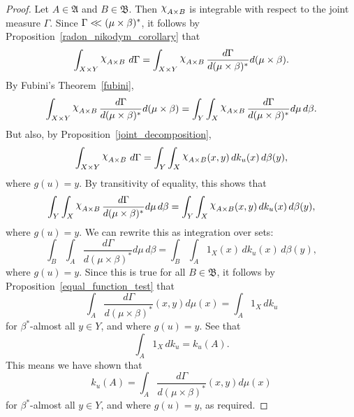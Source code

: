 \documentclass[
twoside=true,
paper=letter,
fontsize=9pt,
pagesize=auto,
leqno,
openany,
headsepline,
overfullrule,
]{scrbook}
\theoremstyle{plain}
\theoremstyle{plain}
\theoremstyle{definition}
\theoremstyle{bfnoteitalic}
\theoremstyle{bfnoteroman}
\newcommand{\sigalg}[1]{\mathfrak{#1}}
\newcommand{\charfunction}[1]{\mathop{{\raisebox{2pt}{$\chi$}}_{#1}}}
\newcommand{\sigmaalgebra}{\sigalg{A}}
\newcommand{\sigmaalgebraii}{\sigalg{B}}
\newcommand{\funcg}{g}
\newcommand{\funck}{k}
\newcommand{\measurespace}{X}
\newcommand{\measurespaceii}{Y}
\newcommand{\mspaceelt}{x}
\newcommand{\mspaceeltii}{y}
\newcommand{\abscont}{\mathrel{< \kern-3.5pt <}}
\newcommand{\measure}{\mu}
\newcommand{\measmu}{\mu}
\newcommand{\seti}{A}
\newcommand{\setii}{B}
\newcommand{\uspaceelt}{u}
\newcommand{\measonprod}{\Gamma}%
\newcommand{\marginaltwo}{\beta}%
\begin{document}
\begin{proof}
Let
$\seti\in\sigmaalgebra$
and
$\setii\in\sigmaalgebraii$.
Then
$\charfunction{\seti\times\setii}$
is integrable with respect to the joint measure
$\measonprod$.
Since
$\measonprod \abscont (\measmu\times\marginaltwo)^*$,
it follows by Proposition~\ref{radon_nikodym_corollary} that
\[
\int_{\measurespace\times\measurespaceii}
\charfunction{\seti\times\setii}
\, d\measonprod
=
\int_{\measurespace\times\measurespaceii}
\charfunction{\seti\times\setii}
\frac{d\measonprod}{d(\measure\times\marginaltwo)^*}
d(\measmu\times\marginaltwo).
\]
By Fubini's Theorem~\ref{fubini},
\[
\int_{\measurespace\times\measurespaceii}
\charfunction{\seti\times\setii}
\frac{d\measonprod}{d(\measure\times\marginaltwo)^*}
d(\measmu\times\marginaltwo)
=
\int_{\measurespaceii}
\int_{\measurespace}
\charfunction{\seti\times\setii}
\frac{d\measonprod}{d(\measure\times\marginaltwo)^*}
d \measmu
\, d \marginaltwo .
\]
But also, by Proposition~\ref{joint_decomposition},
\[
\int_{\measurespace\times\measurespaceii}
\charfunction{\seti\times\setii}
\, d \measonprod
=
\int_\measurespaceii\int_\measurespace
\charfunction{\seti\times\setii}
(\mspaceelt,\mspaceeltii)
\, d \funck_\uspaceelt(\mspaceelt)
\, d \marginaltwo(\mspaceeltii),
\]
where  $\funcg(\uspaceelt) = \mspaceeltii$.
By transitivity of equality, this shows that
\[
\int_{\measurespaceii}
\int_{\measurespace}
\charfunction{\seti\times\setii}
\frac{d\measonprod}{d(\measure\times\marginaltwo)^*}
d \measmu
\, d \marginaltwo
=
\int_\measurespaceii
\int_\measurespace
\charfunction{\seti\times\setii}
(\mspaceelt,\mspaceeltii)
\, d \funck_\uspaceelt(\mspaceelt)
\, d \marginaltwo(\mspaceeltii),
\]
where  $\funcg(\uspaceelt) = \mspaceeltii$.
We can rewrite this as integration over sets:
\[
\int_{\setii}
\int_{\seti}
\frac{d\measonprod}{d(\measure\times\marginaltwo)^*}
d \measmu
\, d \marginaltwo
=
\int_\setii
\int_\seti
1_\measurespace
(\mspaceelt)
\, d \funck_\uspaceelt(\mspaceelt)
\, d \marginaltwo(\mspaceeltii),
\]
where  $\funcg(\uspaceelt) = \mspaceeltii$.
Since this is true for all $\setii\in\sigmaalgebraii$, it follows by Proposition~\ref{equal_function_test} that
\[
\int_{\seti}
\frac{d\measonprod}{d(\measure\times\marginaltwo)^*}
(\mspaceelt,\mspaceeltii)
d \measmu(\mspaceelt)
=
\int_\seti
1_\measurespace
\, d \funck_\uspaceelt
\]
for $\marginaltwo^*$\hyp{}almost all $\mspaceeltii\in\measurespaceii$, and where
$\funcg(\uspaceelt)=\mspaceeltii$.
See that
\[
\int_\seti
1_\measurespace
\, d \funck_\uspaceelt
=
\funck_\uspaceelt(\seti).
\]
This means we have shown that
\[
\funck_\uspaceelt(\seti)
=
\int_{\seti}
\frac{d\measonprod}{d(\measure\times\marginaltwo)^*}
(\mspaceelt,\mspaceeltii)
d \measmu(\mspaceelt)
\]
for $\marginaltwo^*$\hyp{}almost all $\mspaceeltii\in\measurespaceii$, and where
$\funcg(\uspaceelt)=\mspaceeltii$, as required.
\end{proof}
\end{document}
